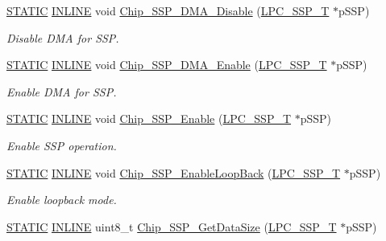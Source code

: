 \begin{DoxyCompactItemize}
\hyperlink{group__LPC__Types__Public__Macros_ga10b2d890d871e1489bb02b7e70d9bdfb}{S\+T\+A\+T\+IC} \hyperlink{group__LPC__Types__Public__Types_ga2eb6f9e0395b47b8d5e3eeae4fe0c116}{I\+N\+L\+I\+NE} void \hyperlink{group__SSP__17XX__40XX_gaa8c7ce019dfcc4ab5731615f66c30e19}{Chip\+\_\+\+S\+S\+P\+\_\+\+D\+M\+A\+\_\+\+Disable} (\hyperlink{structLPC__SSP__T}{L\+P\+C\+\_\+\+S\+S\+P\+\_\+T} $\ast$p\+S\+SP)
\begin{DoxyCompactList}\small\item\em Disable D\+MA for S\+SP. \end{DoxyCompactList}\item 
\hyperlink{group__LPC__Types__Public__Macros_ga10b2d890d871e1489bb02b7e70d9bdfb}{S\+T\+A\+T\+IC} \hyperlink{group__LPC__Types__Public__Types_ga2eb6f9e0395b47b8d5e3eeae4fe0c116}{I\+N\+L\+I\+NE} void \hyperlink{group__SSP__17XX__40XX_gae8bf34541c093c052e5f9baf41fcda8b}{Chip\+\_\+\+S\+S\+P\+\_\+\+D\+M\+A\+\_\+\+Enable} (\hyperlink{structLPC__SSP__T}{L\+P\+C\+\_\+\+S\+S\+P\+\_\+T} $\ast$p\+S\+SP)
\begin{DoxyCompactList}\small\item\em Enable D\+MA for S\+SP. \end{DoxyCompactList}\item 
\hyperlink{group__LPC__Types__Public__Macros_ga10b2d890d871e1489bb02b7e70d9bdfb}{S\+T\+A\+T\+IC} \hyperlink{group__LPC__Types__Public__Types_ga2eb6f9e0395b47b8d5e3eeae4fe0c116}{I\+N\+L\+I\+NE} void \hyperlink{group__SSP__17XX__40XX_gaf49b9a4689c9ae39bbd8c1ac20d31073}{Chip\+\_\+\+S\+S\+P\+\_\+\+Enable} (\hyperlink{structLPC__SSP__T}{L\+P\+C\+\_\+\+S\+S\+P\+\_\+T} $\ast$p\+S\+SP)
\begin{DoxyCompactList}\small\item\em Enable S\+SP operation. \end{DoxyCompactList}\item 
\hyperlink{group__LPC__Types__Public__Macros_ga10b2d890d871e1489bb02b7e70d9bdfb}{S\+T\+A\+T\+IC} \hyperlink{group__LPC__Types__Public__Types_ga2eb6f9e0395b47b8d5e3eeae4fe0c116}{I\+N\+L\+I\+NE} void \hyperlink{group__SSP__17XX__40XX_ga8683ccce6ba5578103efcb791f39cff8}{Chip\+\_\+\+S\+S\+P\+\_\+\+Enable\+Loop\+Back} (\hyperlink{structLPC__SSP__T}{L\+P\+C\+\_\+\+S\+S\+P\+\_\+T} $\ast$p\+S\+SP)
\begin{DoxyCompactList}\small\item\em Enable loopback mode. \end{DoxyCompactList}\item 
\hyperlink{group__LPC__Types__Public__Macros_ga10b2d890d871e1489bb02b7e70d9bdfb}{S\+T\+A\+T\+IC} \hyperlink{group__LPC__Types__Public__Types_ga2eb6f9e0395b47b8d5e3eeae4fe0c116}{I\+N\+L\+I\+NE} uint8\+\_\+t \hyperlink{group__SSP__17XX__40XX_ga421d39f6094d0f335e5acbc3dd5f0b09}{Chip\+\_\+\+S\+S\+P\+\_\+\+Get\+Data\+Size} (\hyperlink{structLPC__SSP__T}{L\+P\+C\+\_\+\+S\+S\+P\+\_\+T} $\ast$p\+S\+SP)

\end{DoxyCompactItemize}
